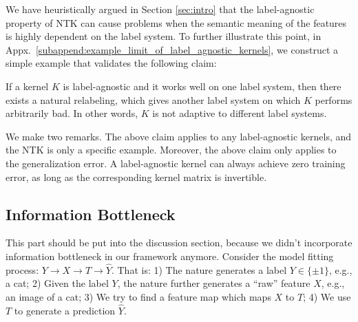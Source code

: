 We have heuristically argued in Section \ref{sec:intro} that the label-agnostic property of NTK can cause problems when the semantic meaning of the features is highly dependent on the label system. To further illustrate this point, in Appx.~\ref{subappend:example_limit_of_label_agnostic_kernels}, we construct a simple example that validates the following claim: 
\begin{claim}
\label{claim: limitations_of_label_agnostic_kernels}
If a kernel $K$ is label-agnostic and it works well on one label system, then there exists a natural relabeling, which gives another label system on which $K$ performs arbitrarily bad. In other words, $K$ is not adaptive to different label systems.
\end{claim}

We make two remarks. The above claim applies to any label-agnostic kernels, and the NTK is only a specific example. 
Moreover, the above claim only applies to the generalization error. A label-agnostic kernel can always achieve zero training error, as long as the corresponding kernel matrix is invertible. 



\iffalse
\subsection{Information Bottleneck}
This part should be put into the discussion section, because we didn't incorporate information bottleneck in our framework anymore.
Consider the model fitting process: $Y\to X \to T \to \hat Y$. That is: 1) The nature generates a label $Y \in \{\pm 1\}$, e.g., a cat; 2) Given the label $Y$, the nature further generates a ``raw'' feature $X$, e.g., an image of a cat; 3) We try to find a feature map which maps $X$ to $T$; 4) We use $T$ to generate a prediction $\hat Y$. 

